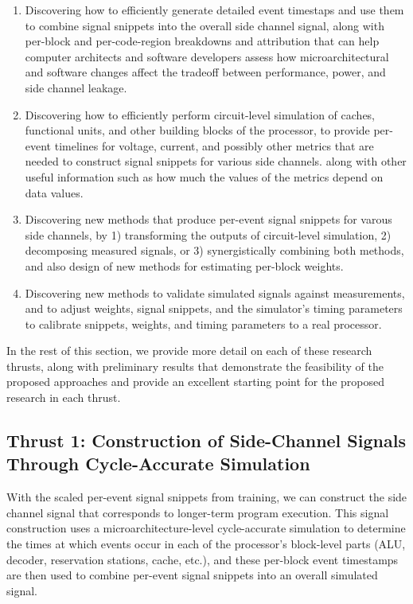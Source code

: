 \begin{enumerate}[topsep=0pt,itemsep=0pt]
\item Discovering how to efficiently generate detailed event timestaps and use them to combine signal snippets into the overall side channel signal, along with per-block and per-code-region breakdowns and attribution that can help computer architects and software developers assess how microarchitectural and software changes affect the tradeoff between performance, power, and side channel leakage.
\item Discovering how to efficiently perform circuit-level simulation of caches, functional units, and other building blocks of the processor, to provide per-event timelines for voltage, current, and possibly other metrics that are needed to construct signal snippets for various side channels. along with other useful information such as how much the values of the metrics depend on data values.
\item Discovering new methods that produce per-event signal snippets for varous side channels, by 1) transforming the outputs of circuit-level simulation, 2) decomposing measured signals, or 3) synergistically combining both methods, and also design of new methods for estimating per-block weights.
\item Discovering new methods to validate simulated signals against measurements, and to adjust weights, signal snippets, and the simulator's timing parameters to calibrate snippets, weights, and timing parameters to a real processor.
\end{enumerate}

In the rest of this section, we provide more detail on each of these research thrusts, along with preliminary results that demonstrate the feasibility of the proposed approaches and provide an excellent starting point for the proposed research in each thrust.

\subsection{Thrust 1: Construction of Side-Channel Signals Through Cycle-Accurate Simulation}

With the scaled per-event signal snippets from training, we can construct the side channel signal that corresponds to longer-term program execution. This signal construction uses a microarchitecture-level cycle-accurate simulation to determine the times at which events occur in each of the processor's block-level parts (ALU, decoder, reservation stations, cache, etc.), and these per-block event timestamps are then used to combine per-event signal snippets into an overall simulated signal. 

